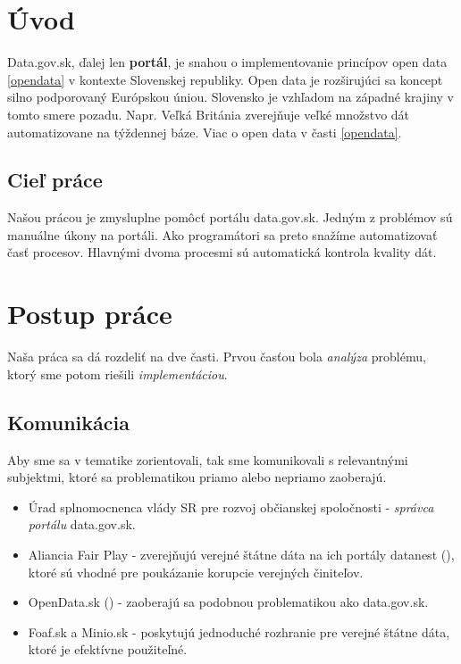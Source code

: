 \documentclass[12pt,a4paper]{article}
\begin{document}
\newpage

\section{Úvod}

Data.gov.sk, ďalej len {\bf portál}, je snahou o implementovanie princípov open data \ref{opendata} v kontexte Slovenskej republiky. Open data je rozširujúci sa koncept silno podporovaný Európskou úniou. Slovensko je vzhľadom na západné krajiny v tomto smere pozadu. Napr. Veľká Británia zverejňuje veľké množstvo dát automatizovane na týždennej báze. Viac o open data v časti \ref{opendata}. 

\subsection{Cieľ práce}
Našou prácou je zmysluplne pomôcť portálu data.gov.sk. Jedným z problémov sú manuálne úkony na portáli. Ako programátori sa preto snažíme automatizovať časť procesov. Hlavnými dvoma procesmi sú automatická kontrola kvality dát.%

\section{Postup práce}
Naša práca sa dá rozdeliť na dve časti. Prvou časťou bola \emph{analýza} problému, ktorý sme potom riešili \emph{implementáciou}. 

\subsection{Komunikácia}
Aby sme sa v tematike zorientovali, tak sme komunikovali s relevantnými subjektmi, ktoré sa problematikou priamo alebo nepriamo zaoberajú. 

\begin{itemize} 
  \item Úrad splnomocnenca vlády SR pre rozvoj občianskej spoločnosti - \emph{správca portálu} data.gov.sk. 
  \item Aliancia Fair Play - zverejňujú verejné štátne dáta na ich portály datanest (\cite{datanest}), ktoré sú vhodné pre poukázanie korupcie verejných činiteľov. 
  \item OpenData.sk (\cite{opendata-sk}) - zaoberajú sa podobnou problematikou ako data.gov.sk. 
  \item Foaf.sk a Minio.sk - poskytujú jednoduché rozhranie pre verejné štátne dáta, ktoré je efektívne použiteľné.  
\end{itemize} 
\end{document}
